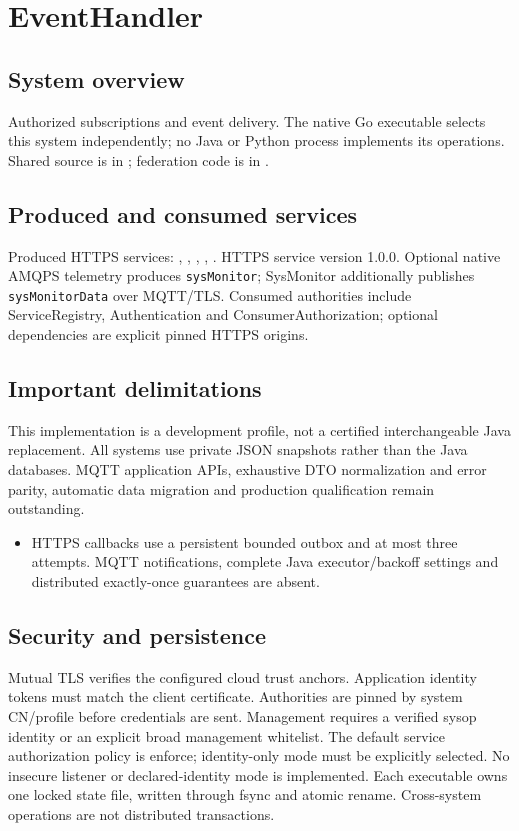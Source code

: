 \documentclass[a4paper]{arrowhead}
\begin{document}
\ArrowheadSetup
\section{EventHandler}
\subsection{System overview}
Authorized subscriptions and event delivery. The native Go executable selects this system independently; no Java or Python process implements its operations. Shared source is in ; federation code is in .
\subsection{Produced and consumed services}
Produced HTTPS services: , \allowbreak {}, \allowbreak {}, \allowbreak {}, \allowbreak {}.
HTTPS service version 1.0.0. Optional native AMQPS telemetry produces \texttt{sysMonitor}; SysMonitor additionally publishes \texttt{sysMonitorData} over MQTT/TLS. Consumed authorities include ServiceRegistry, Authentication and ConsumerAuthorization; optional dependencies are explicit pinned HTTPS origins.
\subsection{Important delimitations}
This implementation is a development profile, not a certified interchangeable Java replacement. All systems use private JSON snapshots rather than the Java databases. MQTT application APIs, exhaustive DTO normalization and error parity, automatic data migration and production qualification remain outstanding.
\begin{itemize}
\item HTTPS callbacks use a persistent bounded outbox and at most three attempts. MQTT notifications, complete Java executor/backoff settings and distributed exactly-once guarantees are absent.
\end{itemize}
\subsection{Security and persistence}
Mutual TLS verifies the configured cloud trust anchors. Application identity tokens must match the client certificate. Authorities are pinned by system CN/profile before credentials are sent. Management requires a verified sysop identity or an explicit broad management whitelist. The default service authorization policy is enforce; identity-only mode must be explicitly selected. No insecure listener or declared-identity mode is implemented. Each executable owns one locked state file, written through fsync and atomic rename. Cross-system operations are not distributed transactions.
\end{document}
